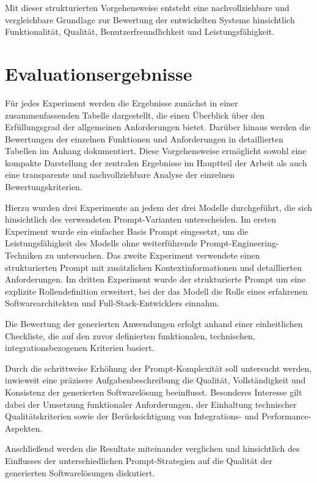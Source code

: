 Mit dieser strukturierten Vorgehensweise entsteht eine nachvollziehbare und vergleichbare Grundlage zur Bewertung der entwickelten Systeme hinsichtlich Funktionalität, Qualität, Benutzerfreundlichkeit und Leistungsfähigkeit.




\chapter{Evaluationsergebnisse}
\label{Evaluationsergebnisse}

Für jedes Experiment werden die Ergebnisse zunächst in einer zusammenfassenden Tabelle dargestellt, die einen Überblick über den Erfüllungsgrad der allgemeinen Anforderungen bietet. Darüber hinaus werden die Bewertungen der einzelnen Funktionen und Anforderungen in detaillierten Tabellen im Anhang dokumentiert. Diese Vorgehensweise ermöglicht sowohl eine kompakte Darstellung der zentralen Ergebnisse im Hauptteil der Arbeit als auch eine transparente und nachvollziehbare Analyse der einzelnen Bewertungskriterien.

Hierzu wurden drei Experimente an jedem der drei Modelle durchgeführt, die sich hinsichtlich des verwendeten Prompt-Varianten unterscheiden. Im ersten Experiment wurde ein einfacher Basis Prompt eingesetzt, um die Leistungsfähigkeit des Modells ohne weiterführende Prompt-Engineering-Techniken zu untersuchen. Das zweite Experiment verwendete einen strukturierten Prompt mit zusätzlichen Kontextinformationen und detaillierten Anforderungen. Im dritten Experiment wurde der strukturierte Prompt um eine explizite Rollendefinition erweitert, bei der das Modell die Rolle eines erfahrenen Softwarearchitekten und Full-Stack-Entwicklers einnahm.

Die Bewertung der generierten Anwendungen erfolgt anhand einer einheitlichen Checkliste, die auf den zuvor definierten funktionalen, technischen, integrationsbezogenen Kriterien basiert. 

Durch die schrittweise Erhöhung der Prompt-Komplexität soll untersucht werden, inwieweit eine präzisere Aufgabenbeschreibung die Qualität, Vollständigkeit und Konsistenz der generierten Softwarelösung beeinflusst. Besonderes Interesse gilt dabei der Umsetzung funktionaler Anforderungen, der Einhaltung technischer Qualitätskriterien sowie der Berücksichtigung von Integrations- und Performance-Aspekten.

Anschließend werden die Resultate miteinander verglichen und hinsichtlich des Einflusses der unterschiedlichen Prompt-Strategien auf die Qualität der generierten Softwarelösungen diskutiert.

